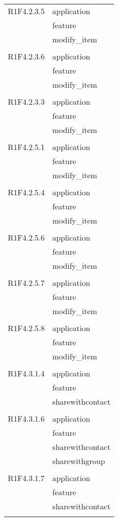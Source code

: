 \begin{center}
\begin{longtable}{|p{7cm}|p{5cm}|}
		R1F4.2.3.5 & application \\ & feature \\ & modify\_item \\ & \\ \hline
		R1F4.2.3.6 & application \\ & feature \\ & modify\_item \\ & \\ \hline
		R1F4.2.3.3 & application \\ & feature \\ & modify\_item \\ & \\ \hline
		R1F4.2.5.1 & application \\ & feature \\ & modify\_item \\ & \\ \hline
		R1F4.2.5.4 & application \\ & feature \\ & modify\_item \\ & \\ \hline
		R1F4.2.5.6 & application \\ & feature \\ & modify\_item \\ & \\ \hline
		R1F4.2.5.7 & application \\ & feature \\ & modify\_item \\ & \\ \hline
		R1F4.2.5.8 & application \\ & feature \\ & modify\_item \\ & \\ \hline
		R1F4.3.1.4 & application \\ & feature \\ & sharewithcontact \\ & \\ \hline
		R1F4.3.1.6 & application \\ & feature \\ & sharewithcontact \\ & sharewithgroup \\ & \\ \hline
		R1F4.3.1.7 & application \\ & feature \\ & sharewithcontact \\ & \\ \hline

\end{longtable}
\end{center}
